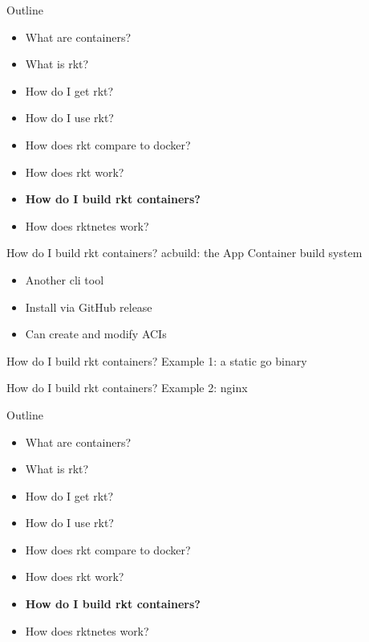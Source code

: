 \documentclass[pdf,aspectratio=169,14pt]{beamer}
\begin{document}
\begin{frame}
    Outline
    \begin{itemize}
        \item What are containers?
        \item What is rkt?
        \item How do I get rkt?
        \item How do I use rkt?
        \item How does rkt compare to docker?
        \item How does rkt work?
        \item \textbf{How do I build rkt containers?}
        \item How does rktnetes work?
    \end{itemize}
\end{frame}

\begin{frame}{How do I build rkt containers?}
    acbuild: the App Container build system
    \begin{itemize}
        \pause
        \item Another cli tool
        \pause
        \item Install via GitHub release
        \pause
        \item Can create and modify ACIs
    \end{itemize}
\end{frame}

\begin{frame}{How do I build rkt containers?}
    Example 1: a static go binary
\end{frame}

\begin{frame}{How do I build rkt containers?}
    Example 2: nginx
\end{frame}

\begin{frame}
    Outline
    \begin{itemize}
        \item What are containers?
        \item What is rkt?
        \item How do I get rkt?
        \item How do I use rkt?
        \item How does rkt compare to docker?
        \item How does rkt work?
        \item \textbf{How do I build rkt containers?}
        \item How does rktnetes work?
    \end{itemize}
\end{frame}
\end{document}
